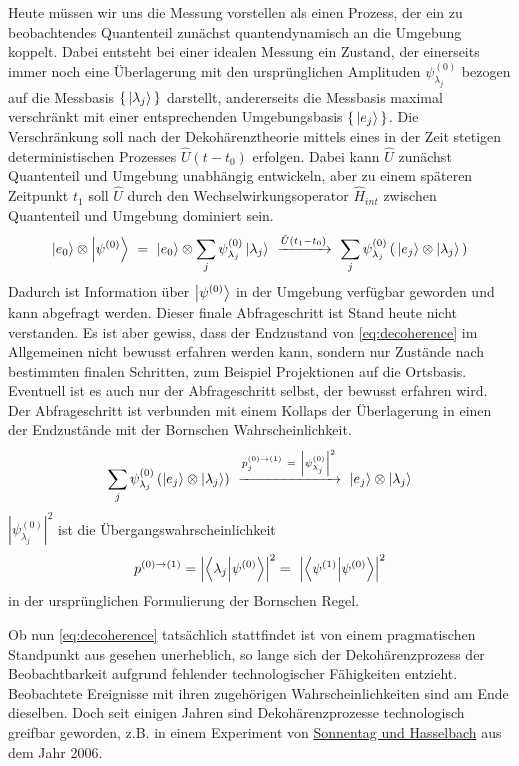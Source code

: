 \documentclass[12pt]{article}
\begin{document}
Heute müssen wir uns die Messung vorstellen als einen Prozess, der ein zu beobachtendes Quantenteil zunächst quantendynamisch an die Umgebung koppelt. 
Dabei entsteht bei einer idealen Messung ein Zustand, der einerseits immer noch eine Überlagerung mit den ursprünglichen Amplituden $\psi^{(0)}_{\lambda_j}$ bezogen auf die Messbasis $\{\,\ket{\lambda_j}\,\}$ darstellt, andererseits die Messbasis maximal verschränkt mit einer entsprechenden Umgebungsbasis $\{\,\ket{e_j}\,\}$. Die Verschränkung soll nach der Dekohärenztheorie mittels eines in der Zeit stetigen deterministischen Prozesses $\hat{U}(t-t_0)$ erfolgen. Dabei kann $\hat{U}$ zunächst Quantenteil und Umgebung unabhängig entwickeln, aber zu einem späteren Zeitpunkt $t_1$ soll $\hat{U}$ durch den Wechselwirkungsoperator $\hat{H}_{int}$ zwischen Quantenteil und Umgebung dominiert sein.
\begin{equation}
\label{eq:decoherence}
\ket{e_0}\otimes\ket{\psi^{(0)}}\ =\ \ket{e_0}\otimes\sum_j \psi^{(0)}_{\lambda_j} \ket{\lambda_j}
\ \xrightarrow{\hat{U}(t_1-t_0)}\ \sum_j \psi^{(0)}_{\lambda_j} \left(\, \ket{e_j} \otimes \ket{\lambda_j}\, \right)
\end{equation}
Dadurch ist Information über $\ket{\psi^{(0)}}$ in der Umgebung verfügbar geworden und kann abgefragt werden. Dieser finale Abfrageschritt ist Stand heute nicht verstanden. Es ist aber gewiss, dass der Endzustand von \eqref{eq:decoherence} im Allgemeinen nicht bewusst erfahren werden kann, sondern nur Zustände nach bestimmten finalen Schritten, zum Beispiel Projektionen auf die Ortsbasis. Eventuell ist es auch nur der Abfrageschritt selbst, der bewusst erfahren wird. Der Abfrageschritt ist verbunden mit einem Kollaps der Überlagerung in einen der Endzustände mit der Bornschen Wahrscheinlichkeit.
\begin{equation} 
\label{eq:collapse}
\sum_j \psi^{(0)}_{\lambda_j} \left( \ket{e_j} \otimes \ket{\lambda_j} \right)
\ \xrightarrow{p_j^{(0)\rightarrow(1)}\ =\ \left|\psi^{(0)}_{\lambda_j}\right|^2}\ 
\ket{e_j} \otimes \ket{\lambda_j}
\end{equation}
$\left|\psi^{(0)}_{\lambda_j}\right|^2$ ist die Übergangswahrscheinlichkeit 
\begin{equation} 
\label{eq:orig_Born}
p^{(0)\rightarrow(1)} 
= \Bigl| \bra{\lambda_j}\ket{\psi^{(0)}} \Bigr| ^2
=\ \Bigl| \bra{\psi^{(1)}}\ket{\psi^{(0)}} \Bigr| ^2
\end{equation}
in der ursprünglichen Formulierung der Bornschen Regel.

Ob nun \eqref{eq:decoherence} tatsächlich stattfindet ist von einem pragmatischen Standpunkt aus gesehen unerheblich, so lange sich der Dekohärenzprozess der Beobachtbarkeit aufgrund fehlender technologischer Fähigkeiten entzieht. Beobachtete Ereignisse mit ihren zugehörigen Wahrscheinlichkeiten sind am Ende dieselben. Doch seit einigen Jahren sind Dekohärenzprozesse technologisch greifbar geworden, z.B. in einem Experiment von \href{https://journals.aps.org/prl/abstract/10.1103/PhysRevLett.98.200402}{Sonnentag und Hasselbach} aus dem Jahr 2006.
\end{document}
